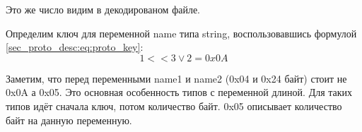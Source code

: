 Это же число видим в декодированом файле.

Определим ключ для переменной name типа string, воспользовавшись формулой \ref{sec_proto_desc:eq:proto_key}: 
\begin{equation*}
    1 << 3 \lor 2 = 0x0A
\end{equation*}

Заметим, что перед переменными name1 и name2 (0x04 и 0x24 байт) стоит не 0x0A а 0x05. Это основная особенность типов с переменной длиной. Для таких типов идёт сначала ключ, потом количество байт. 0x05 описывает количество байт на данную переменную. 


